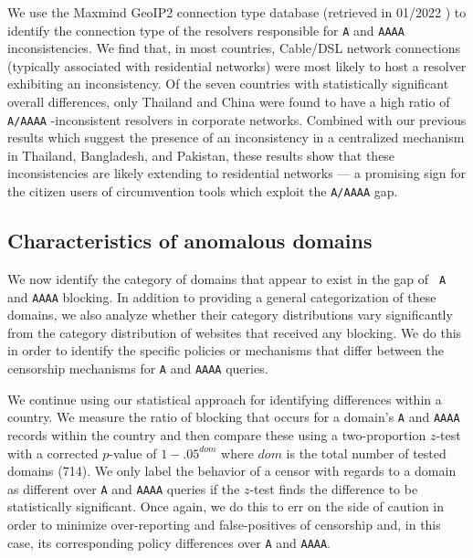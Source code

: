 %
We use the Maxmind GeoIP2 connection type database (retrieved in 01/2022
\cite{maxmind-connectiondb}) to identify the connection type of the resolvers
responsible for {\tt A} and {\tt AAAA} inconsistencies. 
%
We find that, in most countries, Cable/DSL network connections (typically
associated with residential networks) were most likely to host a resolver
exhibiting an inconsistency. 
%
Of the seven countries with statistically significant overall differences, only
Thailand and China were found to have a high ratio of {\tt A/AAAA} -inconsistent
resolvers in corporate networks. 
%
Combined with our previous results which suggest the presence of an
inconsistency in a centralized mechanism in Thailand, Bangladesh, and Pakistan,
these results show that these inconsistencies are likely extending to
residential networks --- a promising sign for the citizen users of
circumvention tools which exploit the {\tt A/AAAA} gap.

\subsection{Characteristics of anomalous domains} 
\label{sec:resources:domains}

We now identify the category of domains that appear to exist in the gap of {\tt
A} and {\tt AAAA} blocking. In addition to providing a general categorization
of these domains, we also analyze whether their category distributions vary
significantly from the category distribution of websites that received any
blocking. We do this in order to identify the specific policies or mechanisms
that differ between the censorship mechanisms for {\tt A} and {\tt AAAA}
queries.

We continue using our statistical approach for identifying differences within
a country. We measure the ratio of blocking that occurs for a domain's {\tt A}
and {\tt AAAA} records within the country and then compare these using
a two-proportion $z$-test with a \Sidak corrected $p$-value of $1-.05^{dom}$
where $dom$ is the total number of tested domains (714). We only label the
behavior of a censor with regards to a domain as different over {\tt A} and
{\tt AAAA} queries if the $z$-test finds the difference to be statistically
significant. Once again, we do this to err on the side of caution in order to
minimize over-reporting and false-positives of censorship and, in this case,
its corresponding policy differences over {\tt A} and {\tt AAAA}.

